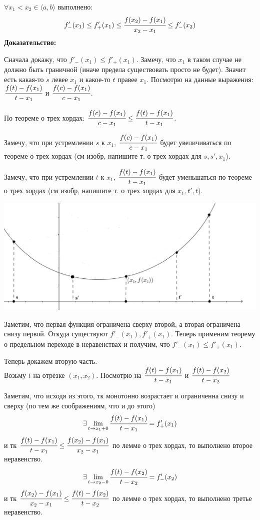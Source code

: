 $\forall x_1<x_2\in \langle a,b\rangle$ выполнено:
$$f'_-(x_1)\leq f'_+(x_1) \leq \cfrac{f(x_2)-f(x_1)}{x_2-x_1}\leq f'_-(x_2)$$
\textbf{Доказательство:}

Сначала докажу, что $f'_-(x_1)\leq f'_+(x_1)$. Замечу, что $x_1$ в таком случае не должно быть граничной (иначе предела существовать просто не будет). Значит есть какая-то $s$ левее $x_1$ и какое-то $t$ правее $x_1$. Посмотрю на данные выражения:
$\cfrac{f(t)-f(x_1)}{t-x_1}$ и $\cfrac{f(c)-f(x_1)}{c-x_1}$. 

По теореме о трех хордах: $\cfrac{f(c)-f(x_1)}{c-x_1} \leq \cfrac{f(t)-f(x_1)}{t-x_1}$.

Замечу, что при устремлении $s$ к $x_1$,  $\cfrac{f(c)-f(x_1)}{c-x_1}$ будет увеличиваться по теореме о трех хордах (см изобр, напишите т. о трех хордах для $s,s',x_1$).

Замечу, что при устремлении $t$ к $x_1$,  $\cfrac{f(t)-f(x_1)}{t-x_1}$ будет  уменьшаться по теореме о трех хордах (см изобр, напишите т. о трех хордах для $x_1,t',t$).


\begin{center}
 \includegraphics[width = 15cm]{assets/integral_1.png}
\end{center}

Заметим, что первая функция ограничена сверху второй, а вторая ограничена снизу первой. Откуда существуют  $f'_-(x_1), f'_+(x_1)$. Теперь применим теорему о предельном переходе в неравенствах и получим, что $f'_-(x_1)\leq f'_+(x_1)$.

Теперь докажем вторую часть.\\
Возьму $t$ на отрезке $(x_1,x_2)$. Посмотрю на  $\cfrac{f(t)-f(x_1)}{t-x_1}$ и $\cfrac{f(t)-f(x_2)}{t-x_2}$

Заметим, что исходя из этого, тк монотонно возрастает и ограниченна снизу и сверху (по тем же соображениям, что и до этого)
$$\exists  \lim\limits_{t \rightarrow x_1 + 0}\cfrac{f(t)-f(x_1)}{t-x_1} = f'_+(x_1)$$ и тк $\cfrac{f(t)-f(x_1)}{t-x_1}\leq\cfrac{f(x_2)-f(x_1)}{x_2-x_1}$ по лемме о трех хордах, то выполнено второе неравенство.
$$\exists  \lim\limits_{t \rightarrow x_2 - 0}\cfrac{f(t)-f(x_2)}{t-x_2} = f'_-(x_2)$$ и тк $ \cfrac{f(x_2)-f(x_1)}{x_2-x_1}\leq \cfrac{f(t)-f(x_2)}{t-x_2}$ по лемме о трех хордах, то выполнено третье неравенство.

